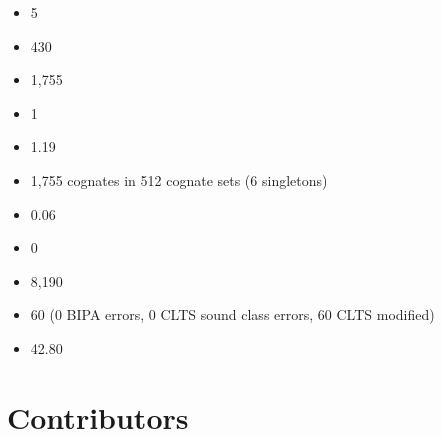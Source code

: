 \documentclass[letterpaper,10pt,english]{sphinxmanual}
\begin{document}
\begin{itemize}
\item {} 
\sphinxAtStartPar
{} 5

\item {} 
\sphinxAtStartPar
{} 430

\item {} 
\sphinxAtStartPar
{} 1,755

\item {} 
\sphinxAtStartPar
{} 1

\item {} 
\sphinxAtStartPar
{} 1.19

\item {} 
\sphinxAtStartPar
{} 1,755 cognates in 512 cognate sets (6 singletons)

\item {} 
\sphinxAtStartPar
{} 0.06

\item {} 
\sphinxAtStartPar
{} 0

\item {} 
\sphinxAtStartPar
{} 8,190

\item {} 
\sphinxAtStartPar
{} 60 (0 BIPA errors, 0 CLTS sound class errors, 60 CLTS
modified)

\item {} 
\sphinxAtStartPar
{} 42.80

\end{itemize}


\section{Contributors}
\label{\detokenize{home:contributors}}
\end{document}
